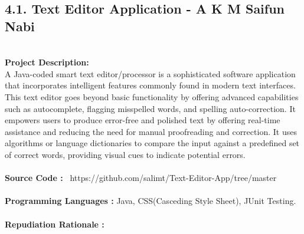 \documentclass[12pt,letterpaper]{report}
\begin{document}
\subsection*{4.1. Text Editor Application - A K M Saifun Nabi } \\
\normalsize {\textbf{Project Description:}} \\
\normalsize {A Java-coded smart text editor/processor is a sophisticated software application that incorporates intelligent features commonly found in modern text interfaces. This text editor goes beyond basic functionality by offering advanced capabilities such as autocomplete, flagging misspelled words, and spelling auto-correction. It empowers users to produce error-free and polished text by offering real-time assistance and reducing the need for manual proofreading and correction.  It uses algorithms or language dictionaries to compare the input against a predefined set of correct words, providing visual cues to indicate potential errors. }\\
\\
\normalsize{\textbf{Source Code :}} 
\normalsize{\ https://github.com/salimt/Text-Editor-App/tree/master }\\
\\
\normalsize{\textbf{Programming Languages :}}
\normalsize{Java, CSS(Casceding Style Sheet), JUnit Testing.}\\
\\
\normalsize{\textbf{Repudiation Rationale : }}
\end{document}
